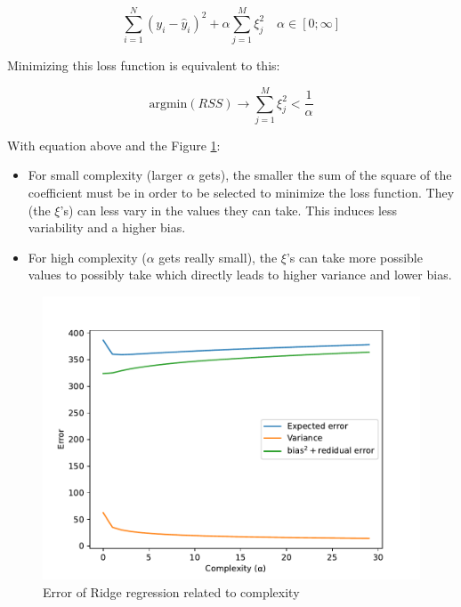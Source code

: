 \documentclass[12pt,titlepage]{article}
\begin{document}
\[ \sum_{i=1}^{N}(y_i - \hat{y}_i)^2 + \alpha \sum_{j=1}^{M} \xi_{j}^{2} \quad \alpha \in [0 ; \infty] \]

\label{eq:loss_fct}

Minimizing this loss function is equivalent to this:

\[ \text{argmin}(RSS) \rightarrow \sum_{j=1}^{M} \xi_{j}^{2} < \frac{1}{\alpha} \]

With equation above and the Figure \ref{fig:error_ridge}: \\
\begin{itemize}
    \item 
    For small complexity (larger $\alpha$ gets), the smaller the sum of the square of the coefficient must be in order to be selected to minimize the loss function. They (the $\xi$’s) can less vary in the values they can take. This induces less variability and a higher bias.
    
    \item 
    For high complexity ($\alpha$ gets really small), the $\xi$’s can take more possible values to possibly take which directly leads to higher variance and lower bias.
\end{itemize}


\begin{figure}[H]
    \centering
    \includegraphics[scale = 0.8]{image/2.3_ridge_regressor.pdf}
    \caption{Error of Ridge regression related to complexity}
    \label{fig:error_ridge}
\end{figure}
\end{document}
